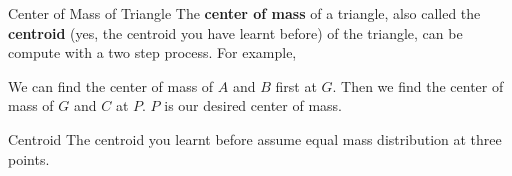 \documentclass{beamer}
\begin{document}
\begin{frame}{Center of Mass of Triangle}
	The \textbf{center of mass} of a triangle, also called the \textbf{centroid} (yes, the centroid you have learnt before) of the triangle, can be compute with a two step process. For example,
	\begin{figure}[H]
	\end{figure}
	 {
	We can find the center of mass of $A$ and $B$ first at $G$. Then we find the center of mass of $G$ and $C$ at $P$. $P$ is our desired center of mass.
	}
	\onslide<3-> {
	\begin{block}{Centroid}
		The centroid you learnt before assume equal mass distribution at three points.
	\end{block}
	}
\end{frame}
\end{document}
